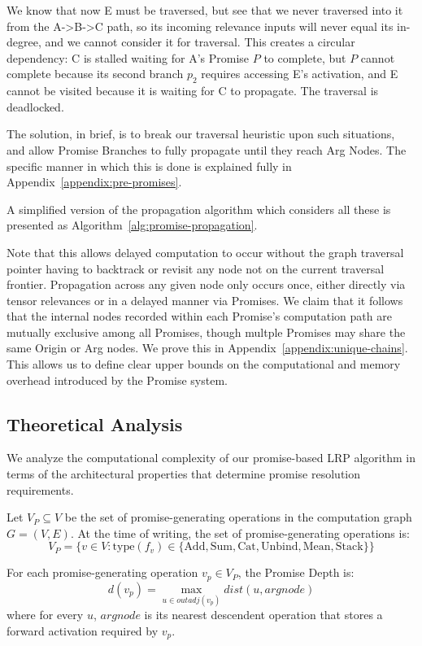 \documentclass{article}
\begin{document}
\begin{definition}
We know that now E must be traversed, but see that we never traversed into it from the A->B->C path, so its incoming relevance inputs will never equal its in-degree, and we cannot consider it
for traversal. This creates a circular dependency: C is stalled waiting for A's Promise $P$ to complete, but $P$ cannot complete because its second branch $p_2$ requires accessing E's activation,
and E cannot be visited because it is waiting for C to propagate. The traversal is deadlocked.

The solution, in brief, is to break our traversal heuristic upon such situations, and allow Promise Branches to fully propagate until they reach Arg Nodes.
The specific manner in which this is done is explained fully in Appendix~\ref{appendix:pre-promises}.

A simplified version of the propagation algorithm which considers all these is presented as Algorithm~\ref{alg:promise-propagation}.

Note that this allows delayed computation to occur without the graph traversal pointer having to backtrack or revisit any node not on the current traversal frontier.
Propagation across any given node only occurs once, either directly via tensor relevances or in a delayed manner via Promises. We claim that it follows that the internal nodes recorded
within each Promise's computation path are mutually exclusive among all Promises, though multple Promises may share the same Origin or Arg nodes. We prove this in Appendix~\ref{appendix:unique-chains}.
This allows us to define clear upper bounds on the computational and memory overhead introduced by the Promise system.

\subsection{Theoretical Analysis}
\label{sec:lrp-complexity}

We analyze the computational complexity of our promise-based LRP algorithm in terms of the architectural properties that determine promise resolution requirements.

Let $V_P \subseteq V$ be the set of promise-generating operations in the computation graph $G = (V, E)$.
At the time of writing, the set of promise-generating operations is:
$$V_P = \{v \in V : \text{type}(f_v) \in \{\text{Add}, \text{Sum}, \text{Cat}, \text{Unbind}, \text{Mean}, \text{Stack}\}\}$$
\end{definition}

\begin{definition}
For each promise-generating operation $v_p \in V_P$, the Promise Depth is:
$$d(v_p) = \max_{u \in outadj(v_p)} dist(u, argnode)$$
where for every $u$, $argnode$ is its nearest descendent operation that stores a forward activation required by $v_p$.
\end{definition}
\end{document}
